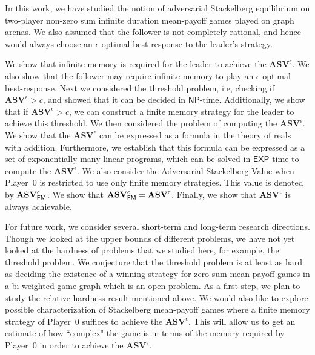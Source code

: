 In this work, we have studied the notion of adversarial Stackelberg equilibrium on two-player non-zero sum infinite duration mean-payoff games played on graph arenas. We also assumed that the follower is not completely rational, and hence would always choose an $\epsilon$-optimal best-response to the leader's strategy.

We show that infinite memory is required for the leader to achieve the $\mathbf{ASV}^{\epsilon}$. We also show that the follower may require infinite memory to play an $\epsilon$-optimal best-response. 
Next we considered the threshold problem, i.e, checking if $\mathbf{ASV}^{\epsilon} > c$, and showed that it can be decided in $\mathsf{NP}$-time. Additionally, we show that if $\mathbf{ASV}^{\epsilon} > c$, we can construct a finite memory strategy for the leader to achieve this threshold. 
We then considered the problem of computing the $\mathbf{ASV}^{\epsilon}$.
We show that the $\mathbf{ASV}^{\epsilon}$ can be expressed as a formula in the theory of reals with addition. Furthermore, we establish that this formula can be expressed as a set of exponentially many linear programs, which can be solved in $\mathsf{EXP}$-time to compute the $\mathbf{ASV}^{\epsilon}$.
We also consider the Adversarial Stackelberg Value when Player~$0$ is restricted to use only finite memory strategies.
This value is denoted by $\mathbf{ASV}^{\epsilon}_{\sf FM}$.
We show that $\mathbf{ASV}^{\epsilon}_{\sf FM} = \mathbf{ASV}^{\epsilon}$.
Finally, we show that $\mathbf{ASV}^{\epsilon}$ is always achievable.

For future work, we consider several short-term and long-term research directions.
Though we looked at the upper bounds of different problems, we have not yet looked at the hardness of problems that we studied here, for example, the threshold problem.
We conjecture that the threshold problem is at least as hard as deciding the existence of a winning strategy for zero-sum mean-payoff games in a bi-weighted game graph which is an open problem.
As a first step, we plan to study the relative hardness result mentioned above.
We would also like to explore possible characterization of Stackelberg mean-payoff games where a finite memory strategy of Player~$0$ suffices to achieve the $\mathbf{ASV}^{\epsilon}$.
This will allow us to get an estimate of how ``complex" the game is in terms of the memory required by Player~$0$ in order to achieve the $\mathbf{ASV}^{\epsilon}$.

